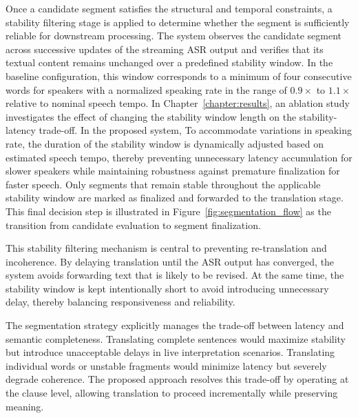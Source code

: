 Once a candidate segment satisfies the structural and temporal constraints, a stability filtering stage is applied to determine whether the segment is sufficiently reliable for downstream processing. The system observes the candidate segment across successive updates of the streaming ASR output and verifies that its textual content remains unchanged over a predefined stability window. In the baseline configuration, this window corresponds to a minimum of four consecutive words for speakers with a normalized speaking rate in the range of $0.9\times$ to $1.1\times$ relative to nominal speech tempo. In Chapter~\ref{chapter:results}, an ablation study investigates the effect of changing the stability window length on the stability-latency trade-off. In the proposed system, To accommodate variations in speaking rate, the duration of the stability window is dynamically adjusted based on estimated speech tempo, thereby preventing unnecessary latency accumulation for slower speakers while maintaining robustness against premature finalization for faster speech. Only segments that remain stable throughout the applicable stability window are marked as finalized and forwarded to the translation stage. This final decision step is illustrated in Figure~\ref{fig:segmentation_flow} as the transition from candidate evaluation to segment finalization.


This stability filtering mechanism is central to preventing re-translation and incoherence. By delaying translation until the ASR output has converged, the system avoids forwarding text that is likely to be revised. At the same time, the stability window is kept intentionally short to avoid introducing unnecessary delay, thereby balancing responsiveness and reliability.

The segmentation strategy explicitly manages the trade-off between latency and semantic completeness. Translating complete sentences would maximize stability but introduce unacceptable delays in live interpretation scenarios. Translating individual words or unstable fragments would minimize latency but severely degrade coherence. The proposed approach resolves this trade-off by operating at the clause level, allowing translation to proceed incrementally while preserving meaning.

